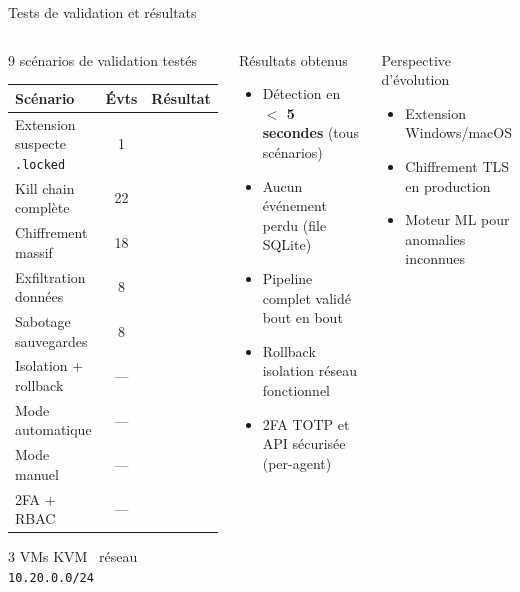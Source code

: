 \documentclass[aspectratio=169,t,10pt]{beamer}
\newcommand{\ok}  {\textcolor{norm}{\faCheckCircle}\ }
\begin{document}
\begin{frame}{Tests de validation et résultats}

  \begin{columns}[T]
      \begin{block}{9 scénarios de validation testés}
        \small
        \renewcommand{\arraystretch}{1.15}
        \begin{tabular}{@{}l c c@{}}
          \toprule
          \textbf{Scénario} & \textbf{Évts} & \textbf{Résultat} \\
          \midrule
          Extension suspecte \texttt{.locked}  & 1  & \ok \\
          Kill chain complète  & 22 & \ok \\
          Chiffrement massif   & 18 & \ok \\
          Exfiltration données &  8 & \ok \\
          Sabotage sauvegardes &  8 & \ok \\
          Isolation + rollback &  — & \ok \\
          Mode automatique     &  — & \ok \\
          Mode manuel          &  — & \ok \\
          2FA + RBAC           &  — & \ok \\
          \bottomrule
        \end{tabular}
        \vspace{3pt}
        {\tiny\color{muted} 3 VMs KVM \textbar\ réseau \texttt{10.20.0.0/24}}
      \end{block}

      \begin{block}{Résultats obtenus}
        \small
        \begin{itemize}\setlength\itemsep{2pt}
          \item[\ok] Détection en \textbf{$<$ 5 secondes} (tous scénarios)
          \item[\ok] Aucun événement perdu (file SQLite)
          \item[\ok] Pipeline complet validé bout en bout
          \item[\ok] Rollback isolation réseau fonctionnel
          \item[\ok] 2FA TOTP et API sécurisée (per-agent)
        \end{itemize}
      \end{block}
      \vspace{3pt}
      \begin{block}{Perspective d'évolution}
        \small
        \begin{itemize}\setlength\itemsep{2pt}
          \item Extension Windows/macOS
          \item Chiffrement TLS en production
          \item Moteur ML pour anomalies inconnues
        \end{itemize}
      \end{block}
  \end{columns}

\end{frame}
\end{document}
